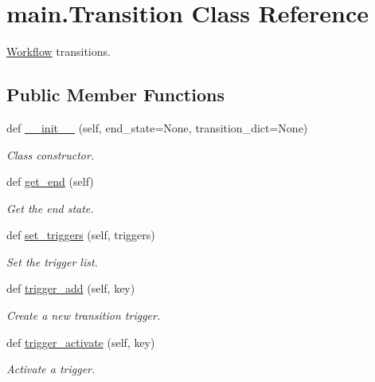 \hypertarget{classmain_1_1_transition}{}\section{main.\+Transition Class Reference}
\label{classmain_1_1_transition}


\hyperlink{classmain_1_1_workflow}{Workflow} transitions.  


\subsection*{Public Member Functions}
\begin{DoxyCompactItemize}
\item 
def \hyperlink{classmain_1_1_transition_a9c17de405e211cf1f3c2f05f584c4675}{\+\_\+\+\_\+init\+\_\+\+\_\+} (self, end\+\_\+state=None, transition\+\_\+dict=None)
\begin{DoxyCompactList}\small\item\em Class constructor. \end{DoxyCompactList}\item 
def \hyperlink{classmain_1_1_transition_aa804e95ea6a0d9a9566785f08a5931cc}{get\+\_\+end} (self)
\begin{DoxyCompactList}\small\item\em Get the end state. \end{DoxyCompactList}\item 
def \hyperlink{classmain_1_1_transition_a8dc53c69ee3381f037ec690f53e0fcd4}{set\+\_\+triggers} (self, triggers)
\begin{DoxyCompactList}\small\item\em Set the trigger list. \end{DoxyCompactList}\item 
def \hyperlink{classmain_1_1_transition_adb1b399d2905614b0792a6cbfe4f1a92}{trigger\+\_\+add} (self, key)
\begin{DoxyCompactList}\small\item\em Create a new transition trigger. \end{DoxyCompactList}\item 
def \hyperlink{classmain_1_1_transition_a8c4baad399a3c41f2f6d8c7c74f6db51}{trigger\+\_\+activate} (self, key)
\begin{DoxyCompactList}\small\item\em Activate a trigger. \end{DoxyCompactList}\item 

\end{DoxyCompactItemize}
